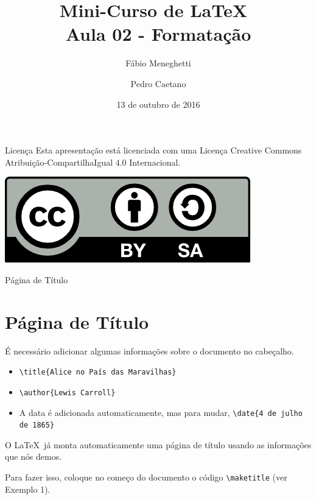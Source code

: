 \documentclass[12pt]{beamer}
\title{Mini-Curso de \LaTeX\ \\ Aula 02 - Formatação}
\author{Fábio Meneghetti \and Pedro Caetano}
\date{13 de outubro de 2016}
\begin{document}
\begin{frame}
  \titlepage
\end{frame}

\begin{frame}{Licença}
  Esta apresentação está licenciada com uma Licença Creative Commons Atribuição-CompartilhaIgual 4.0 Internacional.
  \begin{center}
    \includegraphics[scale=0.3]{../license.png}
  \end{center}
\end{frame}

\begin{frame}
  \tableofcontents
\end{frame}

\begin{frame}[fragile]{Página de Título}
  \section{Página de Título}

  É necessário adicionar algumas informações sobre o documento no cabeçalho.
  \begin{itemize}
    \item \verb+\title{Alice no País das Maravilhas}+
    \item \verb+\author{Lewis Carroll}+
    \item A data é adicionada automaticamente, mas para mudar, \verb+\date{4 de julho de 1865}+
  \end{itemize}

\end{frame}

\begin{frame}[fragile]
  O \LaTeX\ já monta automaticamente uma página de título usando as informações que nós demos.

  Para fazer isso, coloque no começo do documento o código \verb+\maketitle+ (ver Exemplo 1).
\end{frame}
\end{document}
